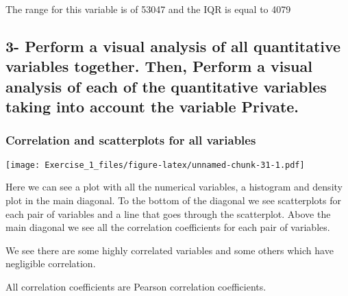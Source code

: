 \documentclass[]{article}
\newenvironment{Shaded}{\begin{snugshade}}{\end{snugshade}}
\newcommand{\DataTypeTok}[1]{\textcolor[rgb]{0.13,0.29,0.53}{#1}}
\newcommand{\DecValTok}[1]{\textcolor[rgb]{0.00,0.00,0.81}{#1}}
\newcommand{\KeywordTok}[1]{\textcolor[rgb]{0.13,0.29,0.53}{\textbf{#1}}}
\newcommand{\NormalTok}[1]{#1}
\newcommand{\OperatorTok}[1]{\textcolor[rgb]{0.81,0.36,0.00}{\textbf{#1}}}
\newcommand{\OtherTok}[1]{\textcolor[rgb]{0.56,0.35,0.01}{#1}}
\newcommand{\StringTok}[1]{\textcolor[rgb]{0.31,0.60,0.02}{#1}}
\begin{document}
The range for this variable is of 53047 and the IQR is equal to 4079

\hypertarget{perform-a-visual-analysis-of-all-quantitative-variables-together.-then-perform-a-visual-analysis-of-each-of-the-quantitative-variables-taking-into-account-the-variable-private.}{%
\subsection{3- Perform a visual analysis of all quantitative variables
together. Then, Perform a visual analysis of each of the quantitative
variables taking into account the variable
Private.}\label{perform-a-visual-analysis-of-all-quantitative-variables-together.-then-perform-a-visual-analysis-of-each-of-the-quantitative-variables-taking-into-account-the-variable-private.}}

\hypertarget{correlation-and-scatterplots-for-all-variables}{%
\subsubsection{Correlation and scatterplots for all
variables}\label{correlation-and-scatterplots-for-all-variables}}

\begin{Shaded}
\end{Shaded}

\texttt{[image: Exercise\_1\_files/figure-latex/unnamed-chunk-31-1.pdf]}

Here we can see a plot with all the numerical variables, a histogram and
density plot in the main diagonal. To the bottom of the diagonal we see
scatterplots for each pair of variables and a line that goes through the
scatterplot. Above the main diagonal we see all the correlation
coefficients for each pair of variables.

We see there are some highly correlated variables and some others which
have negligible correlation.

All correlation coefficients are Pearson correlation coefficients.
\end{document}
